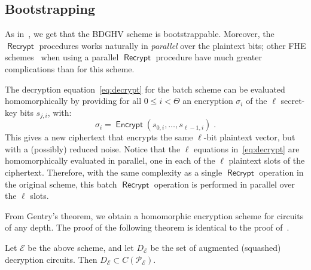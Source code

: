 \documentclass{llncs}
\renewcommand\leq\leqslant
\DeclareMathOperator{\Encrypt}{\ensuremath{\mathsf{Encrypt}}}
\DeclareMathOperator{\Recrypt}{\ensuremath{\mathsf{Recrypt}}}
\newcommand\ignore[1]{}
\begin{document}
\subsection{Bootstrapping}\label{subsec:bootstrapping}

As in~\cite{vDGHV2010}, we get that the BDGHV scheme is
bootstrappable. Moreover, the $\Recrypt$ procedures works naturally in \emph{parallel} over the plaintext bits; other FHE schemes~\cite{SV2011,GHS2012a} when using
a parallel $\Recrypt$ procedure have much greater complications than for this
scheme.

\ignore{
In the original DGHV scheme, the decryption equation
was:
\begin{equation}
\label{eq:msz}
m \leftarrow\left[\left\lfloor\sum_{i=0}^{\Theta-1}
s_{i} \cdot z_{i}\right\rceil\right]_2 \oplus
(c \bmod 2) 
\end{equation}
and could be homomorphically evaluated by providing an
encryption $\sigma_i$ of every secret-key bit $s_i$; one would obtain a new
ciphertext which would encrypt the same plaintext bit $m$ but with a
possibly reduced noise.

Similarly, t}
The decryption equation~\eqref{eq:decrypt} for the batch
scheme can be evaluated homomorphically by providing   for
all $0 \leq i < \Theta$ an encryption $\sigma_i$ of the $\ell$
secret-key bits $s_{j,i}$, with:
\[ {\sigma}_i = \Encrypt(s_{0,i}, \ldots, s_{\ell-1,i})\;. \]
This gives a new
ciphertext that encrypts the same $\ell$-bit plaintext vector,
but with a (possibly) reduced noise.  \ignore{In other words, instead of having an
homomorphic evaluation of a single 
equation~\eqref{eq:msz}, we have} Notice that the $\ell$ equations 
in~\eqref{eq:decrypt} are homomorphically evaluated in parallel, one in
each of the $\ell$ 
 plaintext slots of the ciphertext. Therefore, with the same complexity as a single $\Recrypt$
operation in the original scheme, this batch $\Recrypt$
operation is performed in parallel over the 
$\ell$ slots.

From Gentry's theorem, we obtain a homomorphic encryption scheme for
circuits of any depth. The proof of the following theorem is identical
to the proof of~\cite[Theorem~5.1]{CMNT2011}.

\begin{theorem}Let $\mathcal E$ be the above scheme, and let
  $D_{\mathcal E}$ be the set of augmented (squashed) decryption
  circuits. Then $D_{\mathcal E}\subset C(\mathcal{P_E})$. 
\end{theorem}
\end{document}
